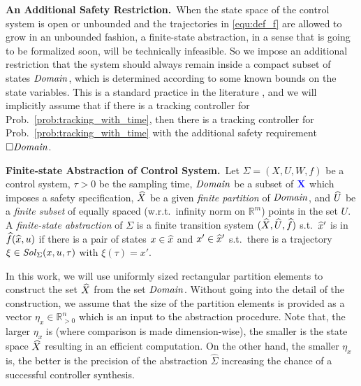 \smallskip
\noindent\textbf{An Additional Safety Restriction.}\
When the state space of the control system is open or unbounded and the trajectories in \eqref{equ:def_f} are allowed to grow in an unbounded fashion, a finite-state abstraction, in a sense that is going to be formalized soon, will be technically infeasible.
So we impose an additional restriction that the system should always remain inside a compact subset of states $\mathit{Domain}$, which is determined according to some known bounds on the state variables.
This is a standard practice in the literature \cite{reissig2016feedback}, and we will implicitly assume that if there is a tracking controller for Prob.~\ref{prob:tracking_with_time}, then there is a tracking controller for Prob.~\ref{prob:tracking_with_time} with the additional safety requirement $\square \mathit{Domain}$.
%

\smallskip
\noindent\textbf{Finite-state Abstraction of Control System.}\
Let $\Sigma = (X, U, W, f)$ be a control system, $\tau>0$ be the sampling time, $\mathit{Domain}$ be a subset of ${\color{blue} \mathbf{X}}$ which imposes a safety specification, $\widehat{X}$ be a given \emph{finite partition} of $\mathit{Domain}$, and $\widehat{U}$ be a \emph{finite subset} of equally spaced (w.r.t.\ infinity norm on $\mathbb{R}^m$) points in the set $U$.
A \emph{finite-state abstraction} of $\Sigma$ is a finite transition system $(\widehat{X},\widehat{U},\widehat{f})$ s.t.\ $\widehat{x}'$ is in $\widehat{f}(\widehat{x},u)$ if there is a pair of states $x\in \widehat{x}$ and $x'\in \widehat{x}'$ s.t.\ there is a trajectory $\xi\in \mathit{Sol}_\Sigma(x,u,\tau)$ with $\xi(\tau)=x'$.

In this work, we will use uniformly sized rectangular partition elements to construct the set $\widehat{X}$ from the set $\mathit{Domain}$.
Without going into the detail of the construction, we assume that the size of the partition elements is provided as a vector $\eta_x\in \mathbb{R}^n_{>0}$ which is an input to the abstraction procedure.
Note that, the larger $\eta_x$ is (where comparison is made dimension-wise), the smaller is the state space $\widehat{X}$ resulting in an efficient computation.
On the other hand, the smaller $\eta_x$ is, the better is the precision of the abstraction $\widehat{\Sigma}$ increasing the chance of a successful controller synthesis.

